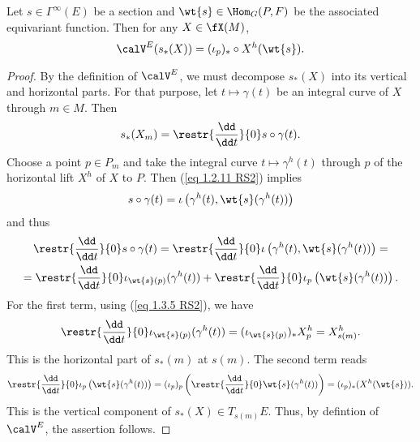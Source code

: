 \begin{prop}[{{\cite[Prop.~1.5.6]{RS2}}}]\label{prop 1.5.6 RS2 my version}
    Let $s\in\Gamma^\infty(E)$ be a section and $\wt{s}\in\Hom_G(P,F)$ be the associated equivariant function. Then for any $X\in\fX(M)$,
    \[\calV^E(s_\ast(X))=(\iota_p)_\ast\circ X^h(\wt{s}).\]
\end{prop}
\begin{proof}
    By the definition of $\calV^E$, we must decompose $s_\ast(X)$ into its vertical and horizontal parts. For that purpose, let $t\mapsto \gamma(t)$ be an integral curve of $X$ through $m\in M$. Then
    \[s_\ast( X_m)=\restr{\frac{\dd}{\dd t}}{0}s\circ \gamma(t).\]
    Choose a point $p\in P_m$ and take the integral curve $t\mapsto \gamma^h(t)$ through $p$ of the horizontal lift $X^h$ of $X$ to $P$. Then (\ref{eq 1.2.11 RS2}) implies
    \[s\circ\gamma(t)=\iota\left(\gamma^h(t),\wt{s}(\gamma^h(t))\right)\]
    and thus
    \begin{multline}
        \restr{\frac{\dd}{\dd t}}{0} s\circ\gamma(t)=\restr{\frac{\dd}{\dd t}}{0} \iota\left(\gamma^h(t),\wt{s}(\gamma^h(t))\right)=\\
        =\restr{\frac{\dd}{\dd t}}{0} \iota_{\wt{s}(p)}(\gamma^h(t))+\restr{\frac{\dd}{\dd t}}{0}\iota_p\left(\wt{s}(\gamma^h(t))\right).
    \end{multline}
    For the first term, using (\ref{eq 1.3.5 RS2}), we have
    \[\restr{\frac{\dd}{\dd t}}{0}\iota_{\wt{s}(p)}(\gamma^h(t))=(\iota_{\wt{s}(p)})_\ast X_p^h=X^h_{s(m)}.\]
    This is the horizontal part of $s_\ast(m)$ at $s(m)$. The second term reads
    \[\restr{\frac{\dd}{\dd t}}{0}\iota_p\left(\wt{s}(\gamma^h(t))\right)= (\iota_p)_p\left(\restr{\frac{\dd}{\dd t}}{0} \wt{s}(\gamma^h(t))\right)=(\iota_p)_\ast(X^h (\wt{s})).\]
    This is the vertical component of $s_\ast(X)\in T_{s(m)}E$. Thus, by defintion of $\calV^E$, the assertion follows.
\end{proof}

